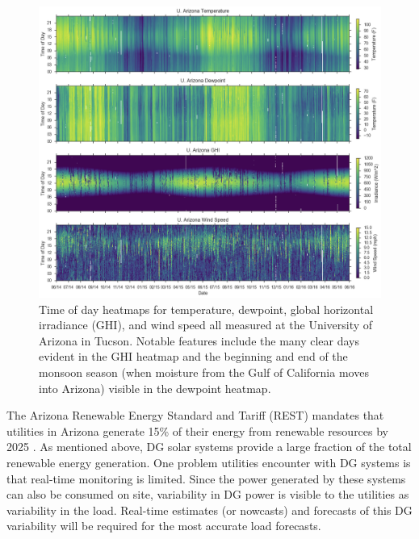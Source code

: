\begin{figure}[p]
\centering
\includegraphics[width=\textwidth]{figs/ua_heat.png}
\caption[Heatmaps of temperature, dewpoint, irradiance, and wind
speed]{Time of day heatmaps for temperature, dewpoint, global
  horizontal irradiance (GHI), and wind speed all measured at the
  University of Arizona in Tucson. Notable features include the many
  clear days evident in the GHI heatmap and the beginning and end of the
  monsoon season (when moisture from the Gulf of California moves into
  Arizona) visible in the dewpoint heatmap.}
\label{fig:ua_heatmap}
\end{figure}

The Arizona Renewable Energy Standard and Tariff (REST) mandates that
utilities in Arizona generate 15\% of their energy from renewable
resources by 2025 \citep{azrest}.
As mentioned above, DG solar systems provide a large fraction of the
total renewable energy generation.
One problem utilities encounter with DG systems is that real-time
monitoring is limited.
Since the power generated by these systems can also be consumed on
site, variability in DG power is visible to the utilities as
variability in the load.
Real-time estimates (or nowcasts) and forecasts of this DG variability
will be required for the most accurate load forecasts.

